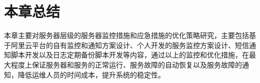 \section{本章总结}
本章主要对服务器层级的服务器监控措施和应急措施的优化策略研究，主要包括基于阿里云平台的自有监控和通知方案设计、个人开发的服务监控方案设计、短信通知脚本开发以及日志定期备份脚本开发等内容，通过以上的监控和优化措施，在最大程度上保证服务器和服务的正常运行、服务故障的自动恢复以及服务故障的通知，降低运维人员的时间成本，提升系统的稳定性。